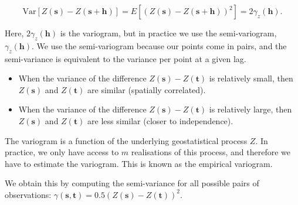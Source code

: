 \documentclass[
  letterpaper,
  DIV=11,
  numbers=noendperiod]{scrartcl}
\begin{document}
\[\mathrm{Var}[Z(\mathbf{s}) - Z(\mathbf{s} + \mathbf{h})] = E[(Z(\mathbf{s}) - Z(\mathbf{s} + \mathbf{h}))^2] = 2\gamma_z(\mathbf{h}).\]

Here, \(2\gamma_z(\mathbf{h})\) is the variogram, but in practice we use
the semi-variogram, \(\gamma_z(\mathbf{h})\). We use the semi-variogram
because our points come in pairs, and the semi-variance is equivalent to
the variance per point at a given lag.

\begin{itemize}
\item
  When the variance of the difference \(Z(\mathbf{s}) - Z(\mathbf{t})\)
  is relatively small, then \(Z(\mathbf{s})\) and \(Z(\mathbf{t})\) are
  similar (spatially correlated).
\item
  When the variance of the difference \(Z(\mathbf{s}) - Z(\mathbf{t})\)
  is relatively large, then \(Z(\mathbf{s})\) and \(Z(\mathbf{t})\) are
  less similar (closer to independence).
\end{itemize}

The variogram is a function of the underlying geostatistical process
\(Z\). In practice, we only have access to \(m\) realisations of this
process, and therefore we have to estimate the variogram. This is known
as the empirical variogram.

We obtain this by computing the semi-variance for all possible pairs of
observations:
\(\gamma(\mathbf{s}, \mathbf{t}) = 0.5(Z(\mathbf{s}) - Z(\mathbf{t}))^2\).
\end{document}
